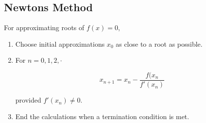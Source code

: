 %
%
%

\subsection{Newtons Method}
For approximating roots of $f(x) = 0$,

\begin{enumerate}
    \item Choose initial approximations $x_0$ as close to a root as possible.
    \item For $n = 0, 1, 2, \cdot$

        \begin{equation}
            x_{n + 1} = x_n - \frac{f(x_n}{f'(x_n)}
        \end{equation}

        provided $f'(x_n) \neq 0$.

    \item End the calculations when a termination condition is met.
\end{enumerate}
